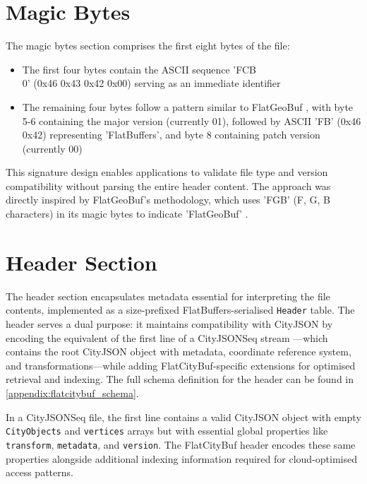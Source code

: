 \section{Magic Bytes}
\label{methodology:file_components:magic_bytes}

The magic bytes section comprises the first eight bytes of the file:
\begin{itemize}
  \item The first four bytes contain the ASCII sequence 'FCB\\0' (0x46 0x43 0x42 0x00) serving as an immediate identifier
  \item The remaining four bytes follow a pattern similar to FlatGeoBuf \citep{flatgeobuf}, with byte 5-6 containing the major version (currently 01), followed by ASCII 'FB' (0x46 0x42) representing 'FlatBuffers', and byte 8 containing patch version (currently 00)
\end{itemize}

This signature design enables applications to validate file type and version compatibility without parsing the entire header content. The approach was directly inspired by FlatGeoBuf's methodology, which uses 'FGB' (F, G, B characters) in its magic bytes to indicate 'FlatGeoBuf' \citep{horance_2022}.

\section{Header Section}
\label{methodology:file_components:header}

The header section encapsulates metadata essential for interpreting the file contents, implemented as a size-prefixed FlatBuffers-serialised \texttt{Header} table. The header serves a dual purpose: it maintains compatibility with CityJSON by encoding the equivalent of the first line of a CityJSONSeq stream \citep{ledoux_2024}—which contains the root CityJSON object with metadata, coordinate reference system, and transformations—while adding FlatCityBuf-specific extensions for optimised retrieval and indexing. The full schema definition for the header can be found in \autoref{appendix:flatcitybuf_schema}.

In a CityJSONSeq file, the first line contains a valid CityJSON object with empty \texttt{CityObjects} and \texttt{vertices} arrays but with essential global properties like \texttt{transform}, \texttt{metadata}, and \texttt{version}. The FlatCityBuf header encodes these same properties alongside additional indexing information required for cloud-optimised access patterns.

